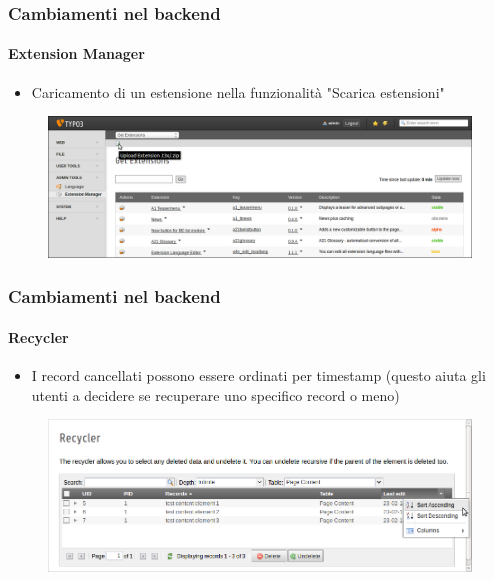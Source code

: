 
\begin{frame}[fragile]
	\frametitle{Cambiamenti nel backend}
	\framesubtitle{Extension Manager}

 	\begin{itemize}
		\item Caricamento di un estensione nella funzionalità "Scarica estensioni"
	\end{itemize}

	\begin{figure}
		\includegraphics[width=0.95\linewidth]{Images/BackendChanges/UploadExtension.png}
	\end{figure}

\end{frame}


\begin{frame}[fragile]
	\frametitle{Cambiamenti nel backend}
	\framesubtitle{Recycler}

 	\begin{itemize}
		\item I record cancellati possono essere ordinati per timestamp\newline
			\small(questo aiuta gli utenti a decidere se recuperare uno specifico record o meno)\normalsize
	\end{itemize}

	\begin{figure}
		\includegraphics[width=0.95\linewidth]{Images/BackendChanges/RecyclerSortRecord.png}
	\end{figure}

\end{frame}

